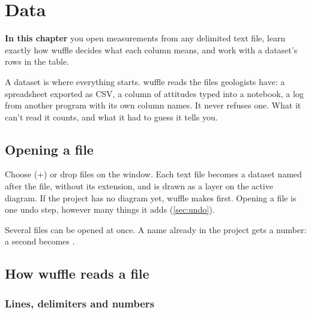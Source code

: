 \chapter{Data}\label{ch:data}
\begin{goals}
\textbf{In this chapter} you open measurements from any delimited text file, learn exactly how wuffle
decides what each column means, and work with a dataset's rows in the table.
\end{goals}

A dataset is where everything starts. wuffle reads the files geologists have: a spreadsheet
exported as CSV, a column of attitudes typed into a notebook, a log from another program with its own
column names. It never refuses one. What it can't read it counts, and what it had to guess it tells you.

\section{Opening a file}\label{sec:data-open}

Choose  (+) or drop files on the window. Each
text file becomes a dataset named after the file, without its extension, and is drawn as a layer on the
active diagram. If the project has no diagram yet, wuffle makes  first. Opening a file is one
undo step, however many things it adds (\cref{sec:undo}).

Several files can be opened at once. A name already in the project gets a number: a second
 becomes .

\section{How wuffle reads a file}\label{sec:data-read}

\subsection{Lines, delimiters and numbers}

